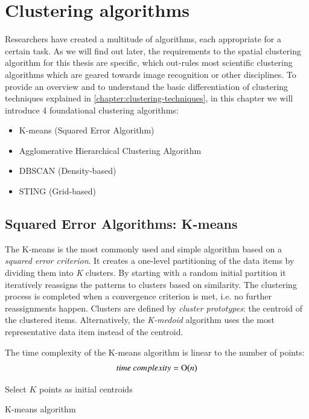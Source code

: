 
%
%

\section{Clustering algorithms}

Researchers have created a multitude of algorithms, each appropriate for a certain task. As we will find out later, the requirements to the spatial clustering algorithm for this thesis are specific, which out-rules most scientific clustering algorithms which are geared towards image recognition or other disciplines. To provide an overview and to understand the basic differentiation of clustering techniques explained in \ref{chapter:clustering-techniques}, in this chapter we will introduce 4 foundational clustering algorithms:
\begin{itemize}
\item {K-means (Squared Error Algorithm)}
\item {Agglomerative Hierarchical Clustering Algorithm}
\item {DBSCAN (Density-based)}
\item {STING (Grid-based)}
\end{itemize}

\subsection{Squared Error Algorithms: K-means}
\label{chapter:k-means}

The K-means is the most commonly used and simple algorithm based on a \textit{squared error criterion}. It creates a one-level partitioning of the data items by dividing them into \textit{K} clusters. By starting with a random initial partition it iteratively reassigns the patterns to clusters based on similarity.  The clustering process is completed when a convergence criterion is met, i.e. no further reassignments happen. Clusters are defined by \textit{cluster prototypes}: the centroid of the clustered items. Alternatively, the \textit{K-medoid} algorithm uses the most representative data item instead of the centroid.

The time complexity of the K-means algorithm is linear to the number of points:
\[time~complexity = \operatorname{O}\bigl(n\bigr)\]

\begin{algorithm}[t]
  \BlankLine
  {Select $K$ points as initial centroids}\;
  \caption{K-means algorithm~\cite{Meert06clustermaps}}
  \label{alg:k-means}
\end{algorithm}


